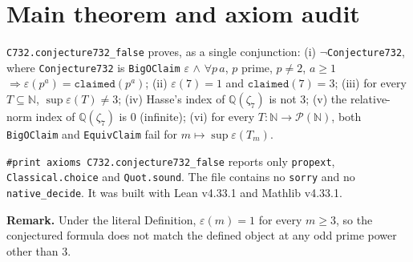 \documentclass[11pt]{article}
\theoremstyle{definition}
\newcommand{\Q}{\mathbb{Q}}
\begin{document}
\section{Main theorem and axiom audit}

\texttt{C732.conjecture732\_false} proves, as a single conjunction:
(i) $\neg$\texttt{Conjecture732}, where \texttt{Conjecture732} is
\texttt{BigOClaim} $\varepsilon$ $\wedge$ $\forall p\,a$, $p$ prime, $p\ne2$, $a\ge1$
$\Rightarrow \varepsilon(p^a)=\texttt{claimed}(p^a)$;
(ii) $\varepsilon(7)=1$ and $\texttt{claimed}(7)=3$;
(iii) for every $T\subseteq\mathbb{N}$, $\sup\varepsilon(T)\ne3$;
(iv) Hasse's index of $\Q(\zeta_7)$ is not $3$;
(v) the relative-norm index of $\Q(\zeta_7)$ is $0$ (infinite);
(vi) for every $T:\mathbb{N}\to\mathcal{P}(\mathbb{N})$, both \texttt{BigOClaim} and
\texttt{EquivClaim} fail for $m\mapsto\sup\varepsilon(T_m)$.

\texttt{\#print axioms C732.conjecture732\_false} reports only \texttt{propext},
\texttt{Classical.choice} and \texttt{Quot.sound}. The file contains no \texttt{sorry} and no
\texttt{native\_decide}. It was built with Lean v4.33.1 and Mathlib v4.33.1.

\textbf{Remark.} Under the literal Definition, $\varepsilon(m)=1$ for every $m\ge3$, so the
conjectured formula does not match the defined object at any odd prime power other than $3$.
\end{document}
